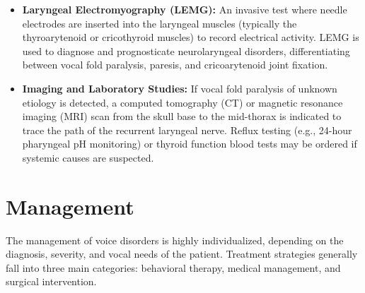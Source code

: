 \begin{itemize}
    \item \textbf{Laryngeal Electromyography (LEMG):} An invasive test where needle electrodes are inserted into the laryngeal muscles (typically the thyroarytenoid or cricothyroid muscles) to record electrical activity. LEMG is used to diagnose and prognosticate neurolaryngeal disorders, differentiating between vocal fold paralysis, paresis, and cricoarytenoid joint fixation.
    \item \textbf{Imaging and Laboratory Studies:} If vocal fold paralysis of unknown etiology is detected, a computed tomography (CT) or magnetic resonance imaging (MRI) scan from the skull base to the mid-thorax is indicated to trace the path of the recurrent laryngeal nerve. Reflux testing (e.g., 24-hour pharyngeal pH monitoring) or thyroid function blood tests may be ordered if systemic causes are suspected.
\end{itemize}

\section*{Management}
The management of voice disorders is highly individualized, depending on the diagnosis, severity, and vocal needs of the patient. Treatment strategies generally fall into three main categories: behavioral therapy, medical management, and surgical intervention.

